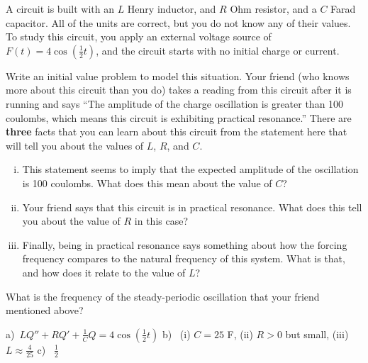 \begin{exercise}
A circuit is built with an $L$ Henry inductor, and $R$ Ohm resistor, and a $C$ Farad capacitor. All of the units are correct, but you do not know any of their values. To study this circuit, you apply an external voltage source of $F(t) = 4 \cos\left(\frac{1}{2} t \right)$, and the circuit starts with no initial charge or current.
\begin{tasks}
\task Write an initial value problem to model this situation.
\task Your friend (who knows more about this circuit than you do) takes a reading from this circuit after it is running and says ``The amplitude of the charge oscillation is greater than 100 coulombs, which means this circuit is exhibiting practical resonance.'' There are \textbf{three} facts that you can learn about this circuit from the statement here that will tell you about the values of $L$, $R$, and $C$. 
\begin{enumerate}[(i)]
\item This statement seems to imply that the expected amplitude of the oscillation is 100 coulombs. What does this mean about the value of $C$?
\item Your friend says that this circuit is in practical resonance. What does this tell you about the value of $R$ in this case?
\item Finally, being in practical resonance says something about how the forcing frequency compares to the natural frequency of this system. What is that, and how does it relate to the value of $L$?
\end{enumerate}
\vspace{-25pt}
\task What is the frequency of the steady-periodic oscillation that your friend mentioned above? 
\end{tasks}
\end{exercise}
\comboSol{%
}
{%
a)~$LQ'' + RQ' + \frac{1}{C}Q = 4\cos\left(\frac{1}{2}t\right)$ \quad b)~ (i) $C = 25$ F, (ii) $R > 0$ but small, (iii) $L \approx \frac{4}{25}$ \quad c)~ $\frac{1}{2}$
}


\setcounter{exercise}{100}

